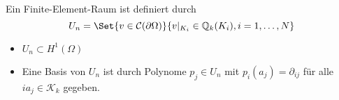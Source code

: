 \documentclass{cheat-sheet}
\newcommand{\Cont}{\mathcal{C}} %
\newcommand{\bOmega}{\partial \Omega} %
\begin{document}
\begin{defn}
  Ein Finite-Element-Raum ist definiert durch
  \[
    U_n = \Set{v \in \Cont(\bOmega)}{v|_{K_i} \in \Q_k(K_i), i = 1, \ldots, N}
  \]
\end{defn}

\begin{satz}
  \begin{itemize}
    \item $U_n \subset H^1(\Omega)$
    \item Eine Basis von $U_n$ ist durch Polynome $p_j \in U_n$ mit $p_i(a_j) = \partial_{ij}$ für alle $ia_j \in \mathcal{K}_k$ gegeben.
  \end{itemize}
\end{satz}
\end{document}

